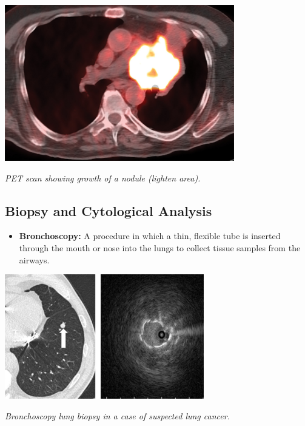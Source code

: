 \vspace{1em}
\begin{center}
    \includegraphics[width=0.75\textwidth]{../assets/04-diagnosis/lc-pet.jpeg}

    \small\textit{PET scan showing growth of a nodule (lighten area). 
    \cite{doi:10.2214/AJR.16.16532}}
\end{center}
\vspace{1em}


\subsection{Biopsy and Cytological Analysis}

\begin{itemize}
    \item \textbf{Bronchoscopy:} A procedure in which a thin, flexible tube is inserted through the 
    mouth or nose into the lungs to collect tissue samples from the airways.
\end{itemize}

\vspace{1em}
\begin{center}
    \includegraphics[width=0.65\textwidth]{../assets/04-diagnosis/lc-bronchoscopy.jpg}

    \small\textit{Bronchoscopy lung biopsy in a case of suspected lung cancer. 
    \cite{haas2018bronchoscopic}}
\end{center}
\vspace{1em}

